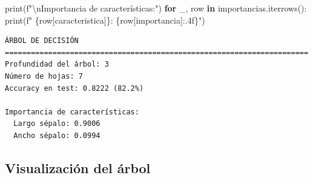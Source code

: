 \documentclass[
  doc,
  floatsintext,
  longtable,
  a4paper,
  nolmodern,
  notxfonts,
  notimes,
  12pt,
  colorlinks=true,linkcolor=blue,citecolor=blue,urlcolor=blue]{apa7}
\newenvironment{Shaded}{\begin{snugshade}}{\end{snugshade}}
\newcommand{\BuiltInTok}[1]{\textcolor[rgb]{0.00,0.23,0.31}{#1}}
\newcommand{\CharTok}[1]{\textcolor[rgb]{0.13,0.47,0.30}{#1}}
\newcommand{\ControlFlowTok}[1]{\textcolor[rgb]{0.00,0.23,0.31}{\textbf{#1}}}
\newcommand{\KeywordTok}[1]{\textcolor[rgb]{0.00,0.23,0.31}{\textbf{#1}}}
\newcommand{\NormalTok}[1]{\textcolor[rgb]{0.00,0.23,0.31}{#1}}
\newcommand{\SpecialCharTok}[1]{\textcolor[rgb]{0.37,0.37,0.37}{#1}}
\newcommand{\SpecialStringTok}[1]{\textcolor[rgb]{0.13,0.47,0.30}{#1}}
\newcommand{\StringTok}[1]{\textcolor[rgb]{0.13,0.47,0.30}{#1}}
\begin{document}
\begin{Shaded}
\begin{Highlighting}[]
\BuiltInTok{print}\NormalTok{(}\SpecialStringTok{f"}\CharTok{\textbackslash{}n}\SpecialStringTok{Importancia de características:"}\NormalTok{)}
\ControlFlowTok{for}\NormalTok{ \_, row }\KeywordTok{in}\NormalTok{ importancias.iterrows():}
    \BuiltInTok{print}\NormalTok{(}\SpecialStringTok{f"  }\SpecialCharTok{\{}\NormalTok{row[}\StringTok{\textquotesingle{}caracteristica\textquotesingle{}}\NormalTok{]}\SpecialCharTok{\}}\SpecialStringTok{: }\SpecialCharTok{\{}\NormalTok{row[}\StringTok{\textquotesingle{}importancia\textquotesingle{}}\NormalTok{]}\SpecialCharTok{:.4f\}}\SpecialStringTok{"}\NormalTok{)}
\end{Highlighting}
\end{Shaded}

\begin{verbatim}
ÁRBOL DE DECISIÓN
======================================================================
Profundidad del árbol: 3
Número de hojas: 7
Accuracy en test: 0.8222 (82.2%)

Importancia de características:
  Largo sépalo: 0.9006
  Ancho sépalo: 0.0994
\end{verbatim}

\subsection{Visualización del
árbol}\label{visualizaciuxf3n-del-uxe1rbol}
\end{document}
